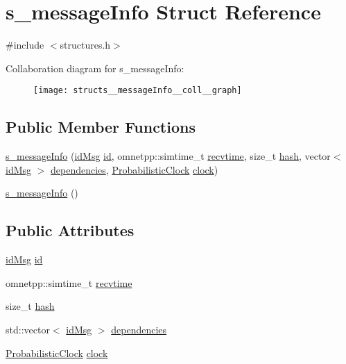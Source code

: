 \hypertarget{structs__messageInfo}{}\section{s\+\_\+message\+Info Struct Reference}
\label{structs__messageInfo}


{\ttfamily \#include $<$structures.\+h$>$}



Collaboration diagram for s\+\_\+message\+Info\+:\nopagebreak
\begin{figure}[H]
\begin{center}
\leavevmode
\texttt{[image: structs\_\_messageInfo\_\_coll\_\_graph]}
\end{center}
\end{figure}
\subsection*{Public Member Functions}
\begin{DoxyCompactItemize}
\item 
\hyperlink{structs__messageInfo_aa626a79c3b41f14b406f8d86b87fcfb9}{s\+\_\+message\+Info} (\hyperlink{structures_8h_a83a1d9a070efa5341da84cfd8e28d3e5}{id\+Msg} \hyperlink{structs__messageInfo_a6c2928774199848fd25b4e8ffb7870c2}{id}, omnetpp\+::simtime\+\_\+t \hyperlink{structs__messageInfo_a3600b24205dc07ce06774af44976c107}{recvtime}, size\+\_\+t \hyperlink{structs__messageInfo_a9b627c36e814fbbd04a89bc6e827e4ff}{hash}, vector$<$ \hyperlink{structures_8h_a83a1d9a070efa5341da84cfd8e28d3e5}{id\+Msg} $>$ \hyperlink{structs__messageInfo_a82f52cb53fb0e9b1b985f173f3a013be}{dependencies}, \hyperlink{classProbabilisticClock}{Probabilistic\+Clock} \hyperlink{structs__messageInfo_ad35ea02bbca3d54d5b150bb6ea476888}{clock})
\item 
\hyperlink{structs__messageInfo_a4cde6289906418221236646ae3df77c8}{s\+\_\+message\+Info} ()
\end{DoxyCompactItemize}
\subsection*{Public Attributes}
\begin{DoxyCompactItemize}
\item 
\hyperlink{structures_8h_a83a1d9a070efa5341da84cfd8e28d3e5}{id\+Msg} \hyperlink{structs__messageInfo_a6c2928774199848fd25b4e8ffb7870c2}{id}
\item 
omnetpp\+::simtime\+\_\+t \hyperlink{structs__messageInfo_a3600b24205dc07ce06774af44976c107}{recvtime}
\item 
size\+\_\+t \hyperlink{structs__messageInfo_a9b627c36e814fbbd04a89bc6e827e4ff}{hash}
\item 
std\+::vector$<$ \hyperlink{structures_8h_a83a1d9a070efa5341da84cfd8e28d3e5}{id\+Msg} $>$ \hyperlink{structs__messageInfo_a82f52cb53fb0e9b1b985f173f3a013be}{dependencies}
\item 
\hyperlink{classProbabilisticClock}{Probabilistic\+Clock} \hyperlink{structs__messageInfo_ad35ea02bbca3d54d5b150bb6ea476888}{clock}
\end{DoxyCompactItemize}


